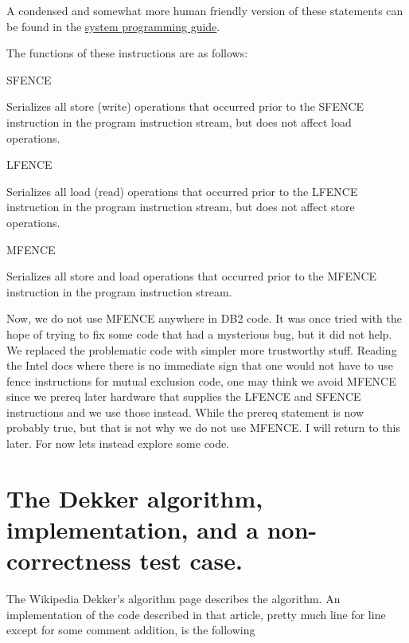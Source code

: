 A condensed and somewhat more human friendly version of these statements can be found in the \href{http://www.intel.com/Assets/PDF/manual/253668.pdf}{system programming guide}.

The functions of these instructions are as follows:
\begin{itemize}
\begin{item}
SFENCE

Serializes all store (write) operations that occurred prior to the SFENCE instruction in the program instruction stream, but does not affect load operations.
\end{item}
\begin{item}
LFENCE

Serializes all load (read) operations that occurred prior to the LFENCE instruction in the program instruction stream, but does not affect store operations.
\end{item}
\begin{item}
MFENCE

Serializes all store and load operations that occurred prior to the MFENCE instruction in the program instruction stream.
\end{item}
\end{itemize}

Now, we do not use MFENCE anywhere in DB2 code.  It was once tried with the hope of trying to fix some code that had a mysterious bug, but it did not help.  We replaced the problematic code with simpler more trustworthy stuff.  Reading the Intel docs where there is no immediate sign that one would not have to use fence instructions for mutual exclusion code, one may think we avoid MFENCE since we prereq later hardware that supplies the LFENCE and SFENCE instructions and we use those instead.  While the prereq statement is now probably true, but that is not why we do not use MFENCE.  I will return to this later.  For now lets instead explore some code.

\section{The Dekker algorithm, implementation, and a non-correctness test case.}

The Wikipedia Dekker's algorithm page \citep{wiki:dekkers} describes the algorithm.  An implementation of the code described in that article, pretty much line for line except for some comment addition, is the following

